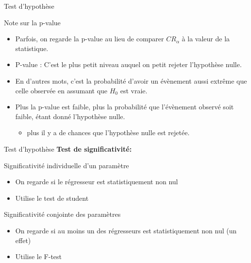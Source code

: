 \documentclass{beamer}
\begin{document}
\begin{frame}{Test d'hypothèse}
\begin{block}{Note sur la p-value}
\begin{itemize}
\item Parfois, on regarde la p-value au lieu de comparer $CR_{\alpha}$ à la valeur de la statistique.
\item P-value : C’est le plus petit niveau auquel on petit rejeter l’hypothèse nulle.
\item En d’autres mots, c’est la probabilité d’avoir un évènement aussi extrême que celle observée en assumant que $H_0$ est vraie. 
\item Plus la p-value est faible, plus la probabilité que l’évènement observé soit faible, étant donné l’hypothèse nulle.
\begin{itemize}
\item plus il y a de chances que l’hypothèse nulle est rejetée.
\end{itemize}
\end{itemize}
\end{block}
\end{frame}

\begin{frame}{Test d'hypothèse}
\textbf{Test de significativité:}
\begin{block}{Significativité individuelle d'un paramètre}
\begin{itemize}
\item On regarde si le régresseur est statistiquement non nul 
\item Utilise le test de student 
\end{itemize}
\end{block}
\begin{block}{Significativité conjointe des paramètres}
\begin{itemize}
\item On regarde si au moins un des régresseurs est statistiquement non nul (un effet)
\item Utilise le F-test
\end{itemize}
\end{block}

\end{frame}
\end{document}
